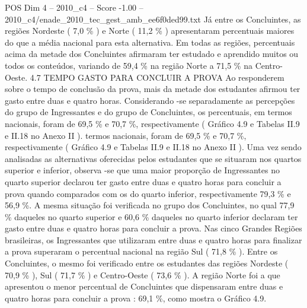 \begin{textsample}{POS Dim 4 – 2010\_c4 – Score -1.00 – 2010\_c4/enade\_2010\_tec\_gest\_amb\_ee6f0ded99.txt}
Já entre os Concluintes, as regiões Nordeste ( 7,0 \% ) e Norte ( 11,2 \% ) apresentaram percentuais maiores do que a média nacional para esta alternativa.
Em todas as regiões, percentuais acima da metade dos Concluintes afirmaram ter estudado e aprendido muitos ou todos os conteúdos, variando de 59,4 \% na região Norte a 71,5 \% na Centro-Oeste. 4.7 TEMPO GASTO PARA CONCLUIR A PROVA Ao responderem sobre o tempo de conclusão da prova, mais da metade dos estudantes afirmou ter gasto entre duas e quatro horas.
Considerando -se separadamente as percepções do grupo de Ingressantes e do grupo de Concluintes, os percentuais, em termos nacionais, foram de 69,5 \% e 70,7 \%, respectivamente ( Gráfico 4.9 e Tabelas II.9 e II.18 no Anexo II ). termos nacionais, foram de 69,5 \% e 70,7 \%, respectivamente ( Gráfico 4.9 e Tabelas II.9 e II.18 no Anexo II ).
Uma vez sendo analisadas as alternativas oferecidas pelos estudantes que se situaram nos quartos superior e inferior, observa -se que uma maior proporção de Ingressantes no quarto superior declarou ter gasto entre duas e quatro horas para concluir a prova quando comparados com os do quarto inferior, respectivamente 79,3 \% e 56,9 \%.
A mesma situação foi verificada no grupo dos Concluintes, no qual 77,9 \% daqueles no quarto superior e 60,6 \% daqueles no quarto inferior declaram ter gasto entre duas e quatro horas para concluir a prova.
Nas cinco Grandes Regiões brasileiras, os Ingressantes que utilizaram entre duas e quatro horas para finalizar a prova superaram o percentual nacional na região Sul ( 71,8 \% ).
Entre os Concluintes, o mesmo foi verificado entre os estudantes das regiões Nordeste ( 70,9 \% ), Sul ( 71,7 \% ) e Centro-Oeste ( 73,6 \% ).
A região Norte foi a que apresentou o menor percentual de Concluintes que dispensaram entre duas e quatro horas para concluir a prova : 69,1 \%, como mostra o Gráfico 4.9.

\end{textsample}
